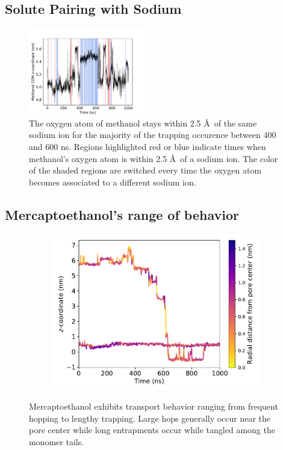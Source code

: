 \documentclass{article}
\begin{document}
  \subsection{Solute Pairing with Sodium}

  \begin{figure}[!htb]
  \centering
  \includegraphics[width=0.45\textwidth]{na_met_trace.pdf}  %
  \caption{The oxygen atom of methanol stays within 2.5 \AA~of the same sodium ion for
  the majority of the trapping occurence between 400 and 600 ns. Regions
  highlighted red or blue indicate times when methanol's oxygen atom is within 
  2.5 \AA~of a sodium ion. The color of the shaded regions are switched every time
  the oxygen atom becomes associated to a different sodium ion.}\label{fig:na_met_trace}
  \end{figure}
  
  \subsection{Mercaptoethanol's range of behavior}
  
  \begin{figure}
  \centering
  \begin{subfigure}{0.45\textwidth}
  \includegraphics[width=\linewidth]{SOH_trace.pdf}
  \caption{}\label{fig:SOH_trace}
  \end{subfigure}
  \caption{Mercaptoethanol exhibits transport behavior ranging from frequent hopping
  to lengthy trapping. Large hops generally occur near the pore center while 
  long entrapments occur while tangled among the monomer tails.}
  \end{figure}
  
\end{document}
